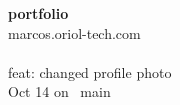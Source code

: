 \begin{tcolorbox}[vercelcard, title={\textcolor{heading}{Personal Projects}}]
\textbf{portfolio} \\
\textcolor{body}{marcos.oriol-tech.com} \\
\vspace{4pt}
 \\
\vspace{4pt}
\textcolor{DockerGray}{\small feat: changed profile photo} \\
\textcolor{DockerGray}{\small Oct 14 on \faCodeBranch\ main}
\end{tcolorbox}
